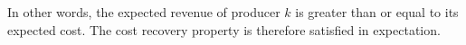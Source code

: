\documentclass{article}
\begin{document}
In other words, the expected revenue of producer $k$ is greater than or equal to its expected cost. The cost recovery property is therefore satisfied in expectation.


\end{document}
